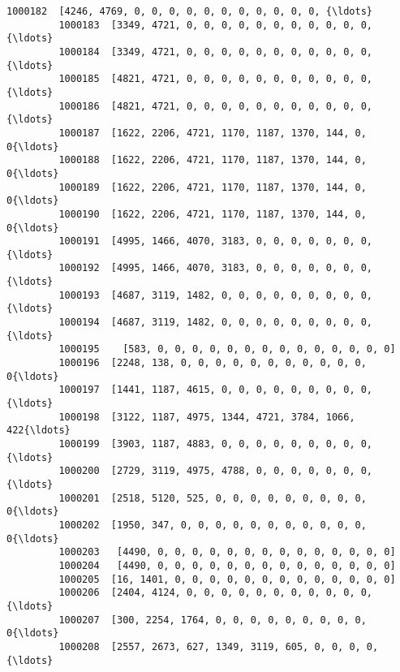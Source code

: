 \documentclass[11pt]{article}
\begin{document}
\begin{Verbatim}[commandchars=\\\{\}]
         1000182  [4246, 4769, 0, 0, 0, 0, 0, 0, 0, 0, 0, 0, 0, {\ldots}   
         1000183  [3349, 4721, 0, 0, 0, 0, 0, 0, 0, 0, 0, 0, 0, {\ldots}   
         1000184  [3349, 4721, 0, 0, 0, 0, 0, 0, 0, 0, 0, 0, 0, {\ldots}   
         1000185  [4821, 4721, 0, 0, 0, 0, 0, 0, 0, 0, 0, 0, 0, {\ldots}   
         1000186  [4821, 4721, 0, 0, 0, 0, 0, 0, 0, 0, 0, 0, 0, {\ldots}   
         1000187  [1622, 2206, 4721, 1170, 1187, 1370, 144, 0, 0{\ldots}   
         1000188  [1622, 2206, 4721, 1170, 1187, 1370, 144, 0, 0{\ldots}   
         1000189  [1622, 2206, 4721, 1170, 1187, 1370, 144, 0, 0{\ldots}   
         1000190  [1622, 2206, 4721, 1170, 1187, 1370, 144, 0, 0{\ldots}   
         1000191  [4995, 1466, 4070, 3183, 0, 0, 0, 0, 0, 0, 0, {\ldots}   
         1000192  [4995, 1466, 4070, 3183, 0, 0, 0, 0, 0, 0, 0, {\ldots}   
         1000193  [4687, 3119, 1482, 0, 0, 0, 0, 0, 0, 0, 0, 0, {\ldots}   
         1000194  [4687, 3119, 1482, 0, 0, 0, 0, 0, 0, 0, 0, 0, {\ldots}   
         1000195    [583, 0, 0, 0, 0, 0, 0, 0, 0, 0, 0, 0, 0, 0, 0]   
         1000196  [2248, 138, 0, 0, 0, 0, 0, 0, 0, 0, 0, 0, 0, 0{\ldots}   
         1000197  [1441, 1187, 4615, 0, 0, 0, 0, 0, 0, 0, 0, 0, {\ldots}   
         1000198  [3122, 1187, 4975, 1344, 4721, 3784, 1066, 422{\ldots}   
         1000199  [3903, 1187, 4883, 0, 0, 0, 0, 0, 0, 0, 0, 0, {\ldots}   
         1000200  [2729, 3119, 4975, 4788, 0, 0, 0, 0, 0, 0, 0, {\ldots}   
         1000201  [2518, 5120, 525, 0, 0, 0, 0, 0, 0, 0, 0, 0, 0{\ldots}   
         1000202  [1950, 347, 0, 0, 0, 0, 0, 0, 0, 0, 0, 0, 0, 0{\ldots}   
         1000203   [4490, 0, 0, 0, 0, 0, 0, 0, 0, 0, 0, 0, 0, 0, 0]   
         1000204   [4490, 0, 0, 0, 0, 0, 0, 0, 0, 0, 0, 0, 0, 0, 0]   
         1000205  [16, 1401, 0, 0, 0, 0, 0, 0, 0, 0, 0, 0, 0, 0, 0]   
         1000206  [2404, 4124, 0, 0, 0, 0, 0, 0, 0, 0, 0, 0, 0, {\ldots}   
         1000207  [300, 2254, 1764, 0, 0, 0, 0, 0, 0, 0, 0, 0, 0{\ldots}   
         1000208  [2557, 2673, 627, 1349, 3119, 605, 0, 0, 0, 0,{\ldots}   
         

\end{Verbatim}
\end{document}
